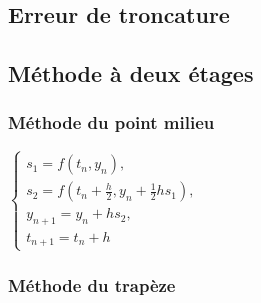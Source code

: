 \documentclass[a4paper,9pt]{extarticle}
\begin{document}
\begin{multicols*}{2}
\subsection{Erreur de troncature}
\subsection{Méthode à deux étages}
\subsubsection{Méthode du point milieu}
$
\begin{cases}
s_1 = f(t_n,y_n),\\
s_2 = f \left(t_n + \frac{h}{2}, y_n + \frac{1}{2}hs_1 \right),\\
y_{n+1} = y_n + hs_2, \\
t_{n+1} = t_n + h
\end{cases}
$
\subsubsection{Méthode du trapèze}


\end{multicols*}
\end{document}
